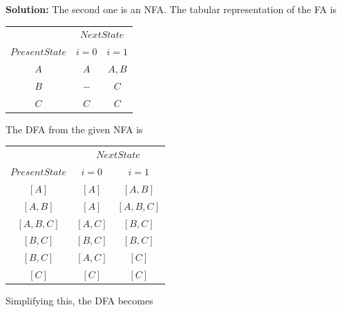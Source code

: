 \textbf{Solution:} The second one is an NFA. The tabular representation of the FA is

\vspace*{0.4cm}
\begin{center}
	\begin{tabular}{ccc}
		\hline
		
		\hline
		
		\hline
		
		\hline
		& \multicolumn{2}{c}{$Next State$}\\
		\cline{2-3}
		$Present State$ &  $i=0$ & $i=1$\\
		\hline
		$A$   &   $A$      &  $A,B$ \\
		$B$   &   $-$      &  $C$   \\
		$C$   &   $C$      &  $C$   \\
		\hline
		
		\hline
		
		\hline
		
		\hline
	\end{tabular}
\end{center}

The DFA from the given NFA is

\vspace*{0.4cm}
\begin{center}
	\begin{tabular}{ccc}
		\hline
		
		\hline
		
		\hline
		
		\hline
		& \multicolumn{2}{c}{$Next State$}\\
		\cline{2-3}
		$Present State$ &  $i=0$ & $i=1$\\
		\hline
		$[A]$     &    $[A]$   &    $[A, B]$  \\
		$[A, B]$    &    $[A]$   &  $[A, B, C]$ \\
		$[A, B, C]$   &  $[A, C]$  &   $[B, C]$   \\
		$[B, C]$     &  $[B, C]$  &   $[B, C]$   \\
		$[B, C]$      &  $[A, C]$  &    $[C]$    \\
		$[C]$        &   $[C]$    &    $[C]$    \\
		
	\end{tabular}
\end{center}

Simplifying this, the DFA becomes

